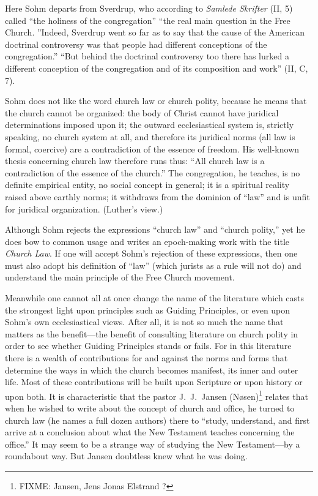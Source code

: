 Here Sohm departs from Sverdrup, who according to \textit{Samlede Skrifter} (II, 5) called ``the holiness of the congregation'' ``the real main question in the Free Church. ''Indeed, Sverdrup went so far as to say that the cause of the American doctrinal controversy was that people had different conceptions of the congregation.'' ``But behind the doctrinal controversy too there has lurked a different conception of the congregation and of its composition and work'' (II, C, 7).

Sohm does not like the word church law or church polity, because he means that the church cannot be organized: the body of Christ cannot have juridical determinations imposed upon it; the outward ecclesiastical system is, strictly speaking, no church system at all, and therefore its juridical norms (all law is formal, coercive) are a contradiction of the essence of freedom. His well-known thesis concerning church law therefore runs thus: ``All church law is a contradiction of the essence of the church.'' The congregation, he teaches, is no definite empirical entity, no social concept in general; it is a spiritual reality raised above earthly norms; it withdraws from the dominion of ``law'' and is unfit for juridical organization. (Luther's view.)

Although Sohm rejects the expressions ``church law'' and ``church polity,'' yet he does bow to common usage and writes an epoch-making work with the title \textit{Church Law}. If one will accept Sohm's rejection of these expressions, then one must also adopt his definition of ``law'' (which jurists as a rule will not do) and understand the main principle of the Free Church movement.

Meanwhile one cannot all at once change the name of the literature which casts the strongest light upon principles such as Guiding Principles, or even upon Sohm's own ecclesiastical views. After all, it is not so much the name that matters as the benefit---the benefit of consulting literature on church polity in order to see whether Guiding Principles stands or fails. For in this literature there is a wealth of contributions for and against the norms and forms that determine the ways in which the church becomes manifest, its inner and outer life. Most of these contributions will be built upon Scripture or upon history or upon both. It is characteristic that the pastor J.~J.~Jansen (N\o{}sen)\footnote{FIXME: Jansen, Jens Jonas Elstrand ? } relates that when he wished to write about the concept of church and office, he turned to church law (he names a full dozen authors) there to ``study, understand, and first arrive at a conclusion about what the New Testament teaches concerning the office.'' It may seem to be a strange way of studying the New Testament---by a roundabout way. But Jansen doubtless knew what he was doing.

